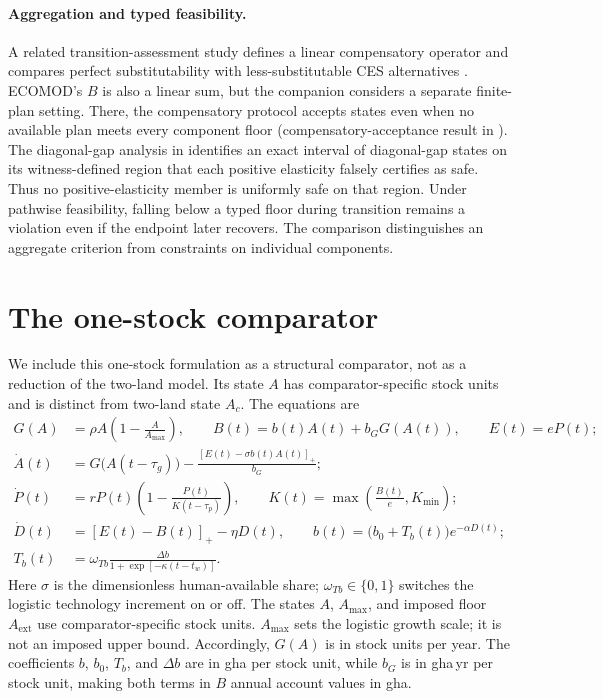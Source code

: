 \documentclass[11pt,a4paper]{article}
\newcommand{\pos}[1]{\left[#1\right]_+}
\begin{document}
\paragraph{Aggregation and typed feasibility.} A related transition-assessment study defines a linear compensatory operator and compares perfect substitutability with less-substitutable CES alternatives \citep{Abaee2026b}. ECOMOD's $B$ is also a linear sum, but the companion considers a separate finite-plan setting. There, the compensatory protocol accepts states even when no available plan meets every component floor (compensatory-acceptance result in \citealt{Abaee2026b}). The diagonal-gap analysis in \citet{Abaee2026b} identifies an exact interval of diagonal-gap states on its witness-defined region that each positive elasticity falsely certifies as safe. Thus no positive-elasticity member is uniformly safe on that region. Under pathwise feasibility, falling below a typed floor during transition remains a violation even if the endpoint later recovers. The comparison distinguishes an aggregate criterion from constraints on individual components.

\section{The one-stock comparator}\label{si:onestock}

We include this one-stock formulation as a structural comparator, not as a reduction of the two-land model. Its state $A$ has comparator-specific stock units and is distinct from two-land state $A_c$. The equations are
\begin{align*}
G(A)&=\rho A\left(1-\frac{A}{A_{\max}}\right),\qquad
B(t)=b(t)A(t)+b_GG(A(t)),\qquad E(t)=eP(t);\\
\dot A(t)&=G\bigl(A(t-\tau_g)\bigr)-\frac{\pos{E(t)-\sigma b(t)A(t)}}{b_G};\\
\dot P(t)&=rP(t)\left(1-\frac{P(t)}{K(t-\tau_p)}\right),\qquad
K(t)=\max\!\left(\frac{B(t)}{e},K_{\min}\right);\\
\dot D(t)&=\pos{E(t)-B(t)}-\eta D(t),\qquad
b(t)=\bigl(b_0+T_b(t)\bigr)e^{-\alpha D(t)};\\
T_b(t)&=\omega_{Tb}\frac{\Delta b}{1+\exp[-\kappa(t-t_w)]}.
\end{align*}
Here $\sigma$ is the dimensionless human-available share; $\omega_{Tb}\in\{0,1\}$ switches the logistic technology increment on or off. The states $A$, $A_{\max}$, and imposed floor $A_{\mathrm{ext}}$ use comparator-specific stock units. $A_{\max}$ sets the logistic growth scale; it is not an imposed upper bound. Accordingly, $G(A)$ is in stock units per year. The coefficients $b$, $b_0$, $T_b$, and $\Delta b$ are in gha per stock unit, while $b_G$ is in gha\,yr per stock unit, making both terms in $B$ annual account values in gha.
\end{document}
